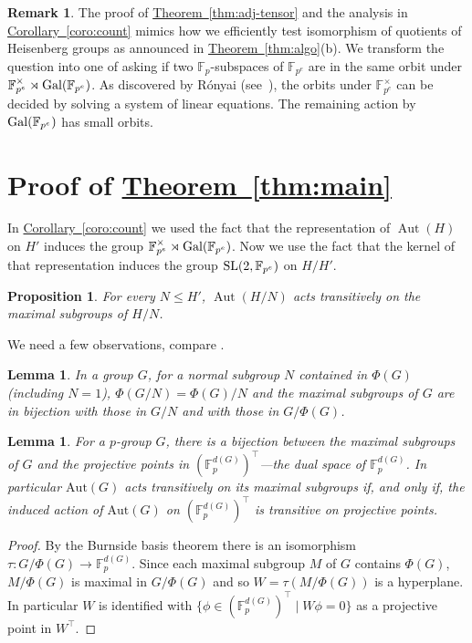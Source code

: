 \documentclass[11pt]{article}
\numberwithin{equation}{section}
\theoremstyle{definition}
\newtheorem{remark}[theorem]{Remark}
\theoremstyle{plain}
\newcommand{\expref}[2]{\hyperref[#2]{#1~\ref{#2}}}
\numberwithin{equation}{section}
\theoremstyle{plain}       %
\newtheorem{lem}[equation]{Lemma}
\newtheorem{prop}[equation]{Proposition}
\theoremstyle{remark}
\theoremstyle{definition}
\numberwithin{figure}{section}
\numberwithin{table}{section}
\newcommand{\bbF}{\mathbb{F}}  %
\DeclareMathOperator{\Aut}{Aut}  %
\begin{document}
\begin{remark}\label{rem:general-iso}
  The proof of \expref{Theorem}{thm:adj-tensor} and the analysis in
  \expref{Corollary}{coro:count} mimics how we efficiently test isomorphism of
  quotients of Heisenberg groups as announced in \expref{Theorem}{thm:algo}(b).  We
  transform the question into one of asking if two $\bbF_p$-subspaces of
  $\bbF_{p^e}$ are in the same orbit under
  $\bbF_{p^e}^{\times}\rtimes {\rm Gal}(\bbF_{p^e})$.  
  As discovered by R{\'o}nyai 
%
  (see~\cite[Lemma~4.8]{LW}),  %
 the orbits under $\bbF_{p^e}^{\times}$ can be decided by solving a system of
 linear equations.  The remaining action by ${\rm Gal}(\bbF_{p^e})$ has small
 orbits.
\end{remark}

\section{Proof of \expref{Theorem}{thm:main}}

In \expref{Corollary}{coro:count} we used the fact that the representation of
$\Aut(H)$ on $H'$ induces the group $\bbF_{p^e}^{\times}\rtimes{\rm
Gal}(\bbF_{p^e})$.  Now we use the fact that the kernel of that representation
induces the group ${\rm SL}(2,\bbF_{p^e})$ on $H/H'$.


\begin{prop}\label{prop:max-conj}
	For every $N\leq H'$, $\Aut(H/N)$ acts 
	transitively on the maximal subgroups of $H/N$.
\end{prop}

We need a few observations, compare \cite[p. 135 \& 140]{Robinson}.

\begin{lem}\label{lem:phi-stuff}
	In a group $G$, for a normal subgroup $N$ contained in $\Phi(G)$ (including
	$N=1$), $\Phi(G/N)=\Phi(G)/N$ and the maximal subgroups of $G$ are in
	bijection with those in $G/N$ and with those in $G/\Phi(G)$.
\end{lem}
	
\begin{lem}\label{lem:basis-2}
	For a $p$-group $G$, there is a bijection between the maximal subgroups of
	$G$ and the projective points in $(\bbF_p^{d(G)})^{\top}$---the dual space
	of $\bbF_p^{d(G)}$.  In particular $\mathrm{Aut}(G)$ acts transitively on
	its maximal subgroups if, and only if, the induced action of
	$\mathrm{Aut}(G)$ on $(\bbF_p^{d(G)})^{\top}$ is transitive on projective
	points.
\end{lem}
\begin{proof}
	By the Burnside basis theorem there is an isomorphism $\tau:G/\Phi(G) \to
\bbF_p^{d(G)}$.  Since each maximal subgroup $M$ of $G$ contains $\Phi(G)$,
$M/\Phi(G)$ is maximal in $G/\Phi(G)$ and so $W=\tau(M/\Phi(G))$ is a
hyperplane.  In particular $W$ is identified with
$\{\phi\in(\bbF_p^{d(G)})^{\top} \mid W\phi=0\}$ as a projective point in
$W^{\top}$.
\end{proof}
\end{document}
